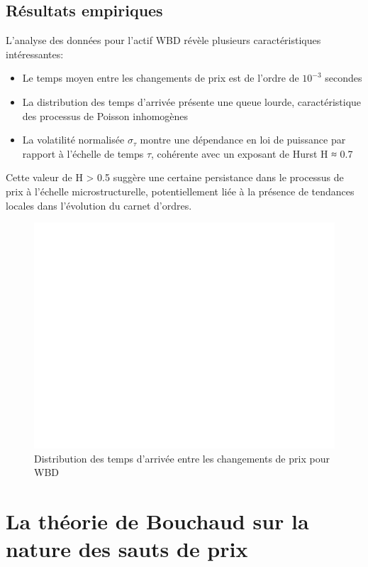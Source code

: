 \documentclass[12pt,a4paper]{article}
\theoremstyle{definition}
\theoremstyle{remark}
\begin{document}
\subsection{Résultats empiriques}

L'analyse des données pour l'actif WBD révèle plusieurs caractéristiques intéressantes:

\begin{itemize}
    \item Le temps moyen entre les changements de prix est de l'ordre de \(10^{-3}\) secondes
    \item La distribution des temps d'arrivée présente une queue lourde, caractéristique des processus de Poisson inhomogènes
    \item La volatilité normalisée \(\sigma_{\tau}\) montre une dépendance en loi de puissance par rapport à l'échelle de temps \(\tau\), cohérente avec un exposant de Hurst H ≈ 0.7
\end{itemize}

Cette valeur de H > 0.5 suggère une certaine persistance dans le processus de prix à l'échelle microstructurelle, potentiellement liée à la présence de tendances locales dans l'évolution du carnet d'ordres.

\begin{figure}[h!]
    \centering
    \includegraphics[width=\textwidth]{results/hurst/plots/WBD/WBD_arrival_times.png}
    \caption{Distribution des temps d'arrivée entre les changements de prix pour WBD}
    \label{fig:arrival_times}
\end{figure}

\section{La théorie de Bouchaud sur la nature des sauts de prix}
\end{document}

